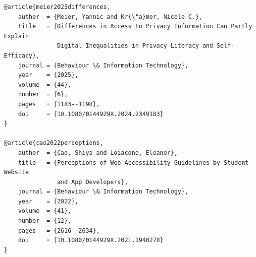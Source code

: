 \documentclass[11pt,a4paper]{article}
\begin{document}
\begin{small}
\begin{Verbatim}[tabsize=4]
@article{meier2025differences,
	author  = {Meier, Yannic and Kr{\"a}mer, Nicole C.},
	title   = {Differences in Access to Privacy Information Can Partly Explain
	           Digital Inequalities in Privacy Literacy and Self-Efficacy},
	journal = {Behaviour \& Information Technology},
	year    = {2025},
	volume  = {44},
	number  = {6},
	pages   = {1183--1198},
	doi     = {10.1080/0144929X.2024.2349183}
}

@article{cao2022perceptions,
	author  = {Cao, Shiya and Loiacono, Eleanor},
	title   = {Perceptions of Web Accessibility Guidelines by Student Website
	           and App Developers},
	journal = {Behaviour \& Information Technology},
	year    = {2022},
	volume  = {41},
	number  = {12},
	pages   = {2616--2634},
	doi     = {10.1080/0144929X.2021.1940278}
}
\end{Verbatim}
\end{small}
\end{document}
